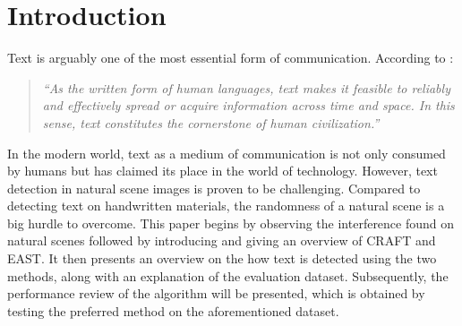 \documentclass[a4paper]{article}
\begin{document}
\section{Introduction} %
\label{sec:introduction}
Text is arguably one of the most essential form of communication. According to \cite{LongEtAl}: 
\begin{quotation}
	\emph{``As the written form of human languages, text makes it feasible to reliably and effectively spread or acquire information across time and space. In this sense, text constitutes the cornerstone of human civilization.''} 
	\citep{LongEtAl} 
\end{quotation}
In the modern world, text as a medium of communication is not only consumed by humans but has claimed its place in the world of technology.
However, text detection in natural scene images is proven to be challenging. Compared to detecting text on handwritten materials, the randomness of a natural scene is a big hurdle to overcome.
This paper begins by observing the interference found on natural scenes followed by introducing and giving an overview of CRAFT and EAST.
It then presents an overview on the how text is detected using the two methods, along with an explanation of the evaluation dataset. Subsequently, the performance review of the algorithm will be presented, which is obtained by testing the preferred method on the aforementioned dataset.
\end{document}
